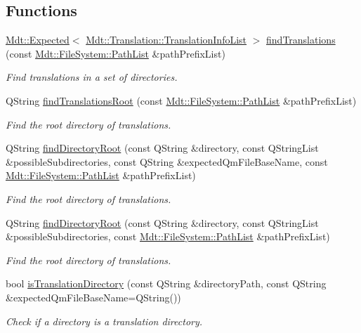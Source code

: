 \subsection*{Functions}
\begin{DoxyCompactItemize}
\item 
\hyperlink{class_mdt_1_1_expected}{Mdt\+::\+Expected}$<$ \hyperlink{class_mdt_1_1_translation_1_1_translation_info_list}{Mdt\+::\+Translation\+::\+Translation\+Info\+List} $>$ \hyperlink{namespace_mdt_1_1_translation_a4267ecfaee1a925cd57515ed7fece047}{find\+Translations} (const \hyperlink{class_mdt_1_1_file_system_1_1_path_list}{Mdt\+::\+File\+System\+::\+Path\+List} \&path\+Prefix\+List)
\begin{DoxyCompactList}\small\item\em Find translations in a set of directories. \end{DoxyCompactList}\item 
Q\+String \hyperlink{namespace_mdt_1_1_translation_a6ddba2861cf4fcca7d47837baf4e17ba}{find\+Translations\+Root} (const \hyperlink{class_mdt_1_1_file_system_1_1_path_list}{Mdt\+::\+File\+System\+::\+Path\+List} \&path\+Prefix\+List)
\begin{DoxyCompactList}\small\item\em Find the root directory of translations. \end{DoxyCompactList}\item 
Q\+String \hyperlink{namespace_mdt_1_1_translation_abc9c4156875731e7a0d4c0f312f334c0}{find\+Directory\+Root} (const Q\+String \&directory, const Q\+String\+List \&possible\+Subdirectories, const Q\+String \&expected\+Qm\+File\+Base\+Name, const \hyperlink{class_mdt_1_1_file_system_1_1_path_list}{Mdt\+::\+File\+System\+::\+Path\+List} \&path\+Prefix\+List)
\begin{DoxyCompactList}\small\item\em Find the root directory of translations. \end{DoxyCompactList}\item 
Q\+String \hyperlink{namespace_mdt_1_1_translation_a493b74f7d450997a4bf0674753533a0f}{find\+Directory\+Root} (const Q\+String \&directory, const Q\+String\+List \&possible\+Subdirectories, const \hyperlink{class_mdt_1_1_file_system_1_1_path_list}{Mdt\+::\+File\+System\+::\+Path\+List} \&path\+Prefix\+List)
\begin{DoxyCompactList}\small\item\em Find the root directory of translations. \end{DoxyCompactList}\item 
bool \hyperlink{namespace_mdt_1_1_translation_a641c0ee60dbd128ecc2b050f17f863fc}{is\+Translation\+Directory} (const Q\+String \&directory\+Path, const Q\+String \&expected\+Qm\+File\+Base\+Name=Q\+String())
\begin{DoxyCompactList}\small\item\em Check if a directory is a translation directory. \end{DoxyCompactList}\end{DoxyCompactItemize}


